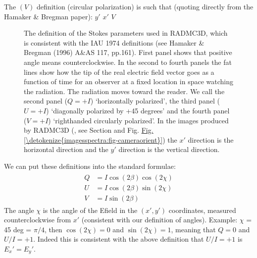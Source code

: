 \documentclass[letterpaper,10pt,english]{sphinxmanual}
\begin{document}
The \((V)\) definition (circular polarization) is such that (quoting
directly from the Hamaker \& Bregman paper):  \(y'\)  \(x'\)  \(V\) 

\begin{figure}[htbp]
\centering
\capstart

\noindent{}
\caption{The definition of the Stokes parameters used in RADMC\sphinxhyphen{}3D, which is consistent
with the IAU 1974 definitions (see Hamaker \& Bregman (1996) A\&AS 117,
pp.161). First panel shows that positive angle means counter\sphinxhyphen{}clockwise. In
the second to fourth panels the fat lines show how the tip of the real
electric field vector goes as a function of time for an observer at a fixed
location in space watching the radiation. The radiation moves toward the
reader. We call the second panel (\(Q=+I\)) ‘horizontally polarized’, the
third panel (\(U=+I\)) ‘diagonally polarized by +45 degrees’ and the
fourth panel (\(V=+I\)) ‘right\sphinxhyphen{}handed circularly polarized’. In the
images produced by RADMC\sphinxhyphen{}3D (, see Section {\hyperref[\detokenize{inputoutputfiles:sec-image-out}]{}}
and Fig. \hyperref[\detokenize{imagesspectra:fig-cameraorient}]{Fig.\@ \ref{\detokenize{imagesspectra:fig-cameraorient}}}) the \(x'\) direction is the horizontal
direction and the \(y'\) direction is the vertical direction.}\label{\detokenize{dustradtrans:id2}}\label{\detokenize{dustradtrans:fig-stokes-definition}}\end{figure}

We can put these definitions into the standard formulae:
\begin{equation*}
\begin{split}\begin{split}
Q &= I\cos(2\beta)\cos(2\chi)\\
U &= I\cos(2\beta)\sin(2\chi)\\
V &= I\sin(2\beta)
\end{split}\end{split}
\end{equation*}
The angle \(\chi\) is the angle of the E\sphinxhyphen{}field in the \((x',y')\)
coordinates, measured counter\sphinxhyphen{}clockwise from \(x'\) (consistent with our
definition of angles). Example: \(\chi\) = 45 deg = \(\pi/4\), then
\(\cos(2\chi)=0\) and \(\sin(2\chi)=1\), meaning that \(Q=0\) and
\(U/I=+1\). Indeed this is consistent with the above definition that
\(U/I=+1\) is \(E_x'=E_y'\).
\end{document}
